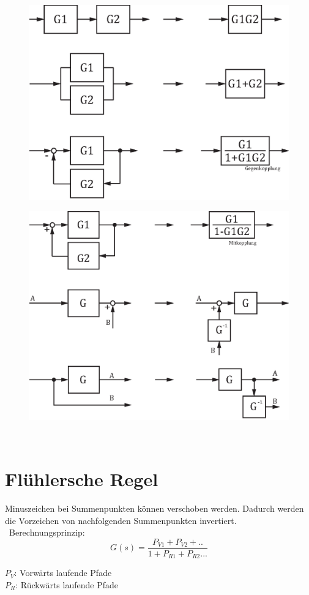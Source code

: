 \begin{center}
\begin{figure}[ht]
	\includegraphics[scale = 0.62]{../fig/teilsysteme_p1.eps}
\end{figure}
\end{center}
\begin{center}
	\begin{figure}[ht]
	\includegraphics[scale = 0.62]{../fig/teilsysteme_p2.eps}
	\end{figure}
\end{center}
\
\\
\section{Flühlersche Regel}
Minuszeichen bei Summenpunkten können verschoben werden. Dadurch werden die Vorzeichen von nachfolgenden Summenpunkten invertiert.
\
Berechnungsprinzip:
\[
	G(s)=\frac{P_{V1}+P_{V2}+..}{1+P_{R1}+P_{R2}...}
\]
\begin{footnotesize}
	$P_V$:	Vorwärts laufende Pfade\\
	$P_R$:	Rückwärts laufende Pfade\\
\end{footnotesize}
